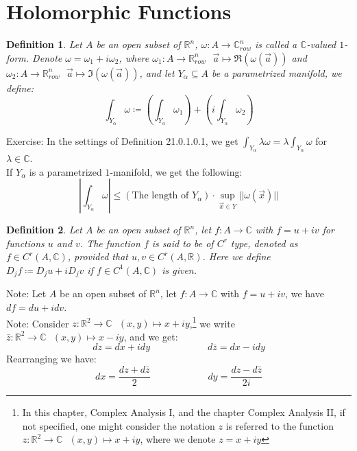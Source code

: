\documentclass[11pt,oneside]{book}
\theoremstyle{break}
\theoremstyle{break}
\newtheorem{defn}{Definition}[corL]
\newcommand{\R}{\mathbb{R}}
\newcommand{\Complex}{\mathbb{C}}
\newcommand{\note}{\color{red}Note: \color{black}}
\newcommand{\exercise}{\color{green}Exercise: \color{black}}
\begin{document}
\newpage
\section[Holomorphic Functions]{\color{red}Holomorphic Functions\color{black}}
\begin{defn}
Let $A$ be an open subset of $\R^n$, $\omega:A \to \Complex^n_{row}$ is called a $\Complex$-valued $1$-form. Denote $\omega = \omega_1 + i \omega_2$,  where $\omega_1: A \to \R^n_{row} \ \ \ \vec{a}\mapsto \Re(\omega(\vec{a}))$ and $\omega_2:A \to \R^n_{row}\ \ \ \vec{a}\mapsto \Im(\omega(\vec{a}))$, and let $Y_\alpha \subseteq A$ be a parametrized manifold, we define: 
$$\int_{Y_\alpha} \omega \coloneqq \left(\int_{Y_\alpha} \omega_1 \right)+\left( i\int_{Y_\alpha} \omega_2\right)$$
\end{defn}

\exercise In the settings of Definition 21.0.1.0.1, we get $\int_{Y_\alpha} \lambda \omega = \lambda \int_{Y_\alpha} \omega$ for $\lambda \in \Complex$. \\
If $Y_\alpha$ is a parametrized $1$-manifold, we get the following:
$$\left| \int_{Y_\alpha}  \omega \right| \leq (\text{The length of }Y_\alpha) \cdot \sup_{\vec{x}\in Y} ||\omega (\vec{x})||$$


\begin{defn}
Let $A$ be an open subset of $\R^n$, let $f:A \to \Complex$ with $f = u+iv$ for functions $u$ and $v$. The function $f$ is said to be of $C^r$ type, denoted as $f \in C^r(A,\Complex)$, provided that $u,v \in C^r(A,\R)$. Here we define $D_j f \coloneqq D_j u + i D_j v$ if $f \in C^1(A,\Complex)$ is given. 
\end{defn}


\note Let $A$ be an open subset of $\R^n$, let $f:A \to \Complex$ with $f=u+iv$, we have $df = du + i dv$. \\
\note Consider $z:\R^2 \to \Complex \ \ \ (x,y)\mapsto x+iy$,\footnote{In this chapter, Complex Analysis I, and the chapter Complex Analysis II, if not specified, one might consider the notation $z$ is referred to the function $z:\R^2 \to \Complex \ \ \ (x,y)\mapsto x+iy$, where we denote $z = x+iy$} we write $\bar{z}:\R^2 \to \Complex \ \ \ (x,y) \mapsto x-iy$, and we get:
$$dz = dx+idy \qquad\qquad\qquad d\bar{z} = dx - i dy$$ 
Rearranging we have:
$$dx = \frac{dz+d\bar{z}}{2}\qquad\qquad\qquad dy = \frac{dz-d\bar{z}}{2i}$$
\end{document}
